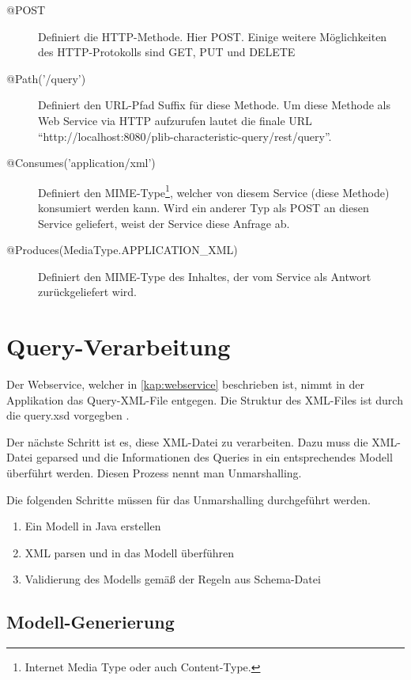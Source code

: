 \begin{description}
\item[@POST] Definiert die \gls{HTTP-Methode}. Hier \gls{POST}. Einige weitere Möglichkeiten des \gls{HTTP}-Protokolls sind GET, PUT und DELETE
\item[@Path('/query')] Definiert den URL-Pfad Suffix für diese Methode. Um diese Methode als Web Service via \gls{HTTP} aufzurufen lautet die finale URL \enquote{http://localhost:8080/plib-characteristic-query/rest/query}. 
\item[@Consumes('application/xml')] Definiert den \gls{MIME-Type}\footnote{Internet Media Type oder auch Content-Type.}, welcher von diesem Service (diese Methode) konsumiert werden kann. Wird ein anderer Typ als POST an diesen Service geliefert, weist der Service diese Anfrage ab. 
\item[@Produces(MediaType.APPLICATION\_XML)] Definiert den \gls{MIME-Type} des Inhaltes, der vom Service als Antwort zurückgeliefert wird.  
\end{description}

\section{Query-Verarbeitung}\label{sec:query_vearbeitung}

Der \gls{Webservice}, welcher in \autoref{kap:webservice} beschrieben ist, nimmt in der Applikation das Query-XML-File entgegen. 
Die Struktur des XML-Files ist durch die query.xsd vorgegben \citep[27]{iso29002-31}. 

Der nächste Schritt ist es, diese XML-Datei zu verarbeiten. Dazu muss die XML-Datei geparsed und die Informationen des Queries in ein entsprechendes Modell überführt werden. Diesen Prozess nennt man \gls{Unmarshalling}. 

Die folgenden Schritte müssen für das \gls{Unmarshalling} durchgeführt werden.

\begin{enumerate}
\item Ein Modell in Java erstellen
\item XML parsen und in das Modell überführen
\item Validierung des Modells gemäß der Regeln aus Schema-Datei
\end{enumerate}

\subsection{Modell-Generierung}\label{sec:modellgenerierung}

